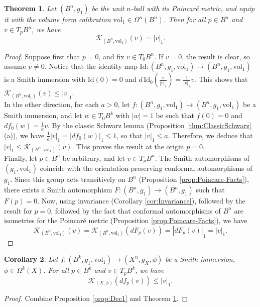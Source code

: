 \documentclass[11pt]{article}
\newcommand{\vol}{\mathrm{vol}}
\newtheorem{thm}{Theorem}[section]
\newtheorem{cor}[thm]{Corollary}
\theoremstyle{definition}
\numberwithin{equation}{section}
\begin{document}
\begin{thm} \label{thm:K-Poincare} Let $(B^n, g_1)$ be the unit $n$-ball with its Poincar\'{e} metric, and equip it with the volume form calibration $\vol_1 \in \Omega^n(B^n)$.  Then for all $p \in B^n$ and $v \in T_pB^n$, we have
$$\mathcal{K}_{(B^n, \vol_1)}(v) = |v|_1.$$
\end{thm}

\begin{proof} Suppose first that $p = 0$, and fix $v \in T_0B^n$.  If $v = 0$, the result is clear, so assume $v \neq 0$.  Notice that the identity map $\mathrm{Id} \colon (B^n, g_1, \vol_1) \to (B^n, g_1, \vol_1)$ is a Smith immersion with $\mathrm{Id}(0) = 0$ and $d\,\mathrm{Id}_0(\frac{v}{|v|_1}) = \frac{1}{|v|_1}v$.  This shows that $\mathcal{K}_{(B^n, \vol_1)}(v) \leq |v|_1$. \\
\indent In the other direction, for each $a > 0$, let $f \colon (B^n, g_1, \vol_1) \to (B^n, g_1, \vol_1)$ be a Smith immersion, and let $w \in T_0B^k$ with $|w| = 1$ be such that $f(0) = 0$ and $df_0(w) = \frac{1}{a}v$.  By the classic Schwarz lemma (Proposition \ref{thm:ClassicSchwarz}(a)), we have $\frac{1}{a}|v|_1 = |df_0(w)|_1 \leq 1$, so that $|v|_1 \leq a$.  Therefore, we deduce that $|v|_1 \leq \mathcal{K}_{(B^n, \vol_1)}(v)$.  This proves the result at the origin $p = 0$. \\
\indent Finally, let $p \in B^n$ be arbitrary, and let $v \in T_pB^n$.  The Smith automorphisms of $(g_1, \vol_1)$ coincide with the orientation-preserving conformal automorphisms of $g_1$.  Since this group acts transitively on $B^n$ (Proposition \ref{prop:Poincare-Facts}), there exists a Smith automorphism $F \colon (B^n, g_1) \to (B^n, g_1)$ such that $F(p) = 0$.  Now, using invariance (Corollary \ref{cor:Invariance}), followed by the result for $p = 0$, followed by the fact that conformal automorphisms of $B^n$ are isometries for the Poincar\'{e} metric (Proposition \ref{prop:Poincare-Facts}), we have
$$\mathcal{K}_{(B^n, \vol_1)}(v) = \mathcal{K}_{(B^n, \vol_1)}(dF_p(v)) = \left| dF_p(v) \right|_1 = \left| v \right|_1.$$
\end{proof}

\begin{cor} \label{cor:Dec2} Let $f \colon (B^k, g_1, \vol_1) \to (X^n, g_X, \phi)$ be a Smith immersion, $\phi \in \Omega^k(X)$.  For all $p \in B^k$ and $v \in T_pB^k$, we have
$$\mathcal{K}_{(X,\phi)}(df_p(v)) \leq |v|_1.$$
\end{cor}

\begin{proof} Combine Proposition \ref{prop:Dec1} and Theorem \ref{thm:K-Poincare}.
\end{proof}
\end{document}
